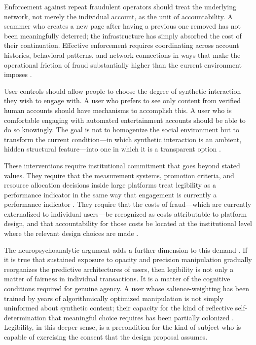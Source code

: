 \documentclass[12pt,a4paper]{article}
\begin{document}
Enforcement against repeat fraudulent operators should treat the underlying network, not merely
the individual account, as the unit of accountability. A scammer who creates a new page after
having a previous one removed has not been meaningfully deterred; the infrastructure has simply
absorbed the cost of their continuation. Effective enforcement requires coordinating across
account histories, behavioral patterns, and network connections in ways that make the operational
friction of fraud substantially higher than the current environment imposes \citep{gillespie2018}.

User controls should allow people to choose the degree of synthetic interaction they wish to
engage with. A user who prefers to see only content from verified human accounts should have
mechanisms to accomplish this. A user who is comfortable engaging with automated entertainment
accounts should be able to do so knowingly. The goal is not to homogenize the social environment
but to transform the current condition---in which synthetic interaction is an ambient, hidden
structural feature---into one in which it is a transparent option \citep{boyd2014}.

These interventions require institutional commitment that goes beyond stated values. They require
that the measurement systems, promotion criteria, and resource allocation decisions inside large
platforms treat legibility as a performance indicator in the same way that engagement is currently
a performance indicator \citep{strathern1997}. They require that the costs of fraud---which are
currently externalized to individual users---be recognized as costs attributable to platform
design, and that accountability for those costs be located at the institutional level where the
relevant design choices are made \citep{noble2018,zuboff2019}.

The neuropsychoanalytic argument adds a further dimension to this demand \citep{dallaglio2024,friston2010}.
If it is true that sustained exposure to opacity and precision manipulation gradually reorganizes
the predictive architectures of users, then legibility is not only a matter of fairness in
individual transactions. It is a matter of the cognitive conditions required for genuine agency.
A user whose salience-weighting has been trained by years of algorithmically optimized
manipulation is not simply uninformed about synthetic content; their capacity for the kind of
reflective self-determination that meaningful choice requires has been partially colonized
\citep{zuboff2019,dallaglio2024}. Legibility, in this deeper sense, is a precondition for the
kind of subject who is capable of exercising the consent that the design proposal assumes.
\end{document}
